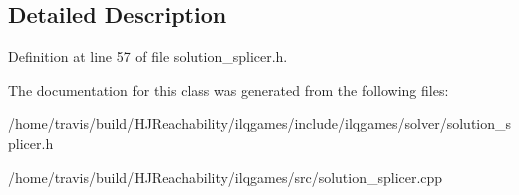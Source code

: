 \subsection{Detailed Description}


Definition at line 57 of file solution\+\_\+splicer.\+h.



The documentation for this class was generated from the following files\+:\begin{DoxyCompactItemize}
\item 
/home/travis/build/\+H\+J\+Reachability/ilqgames/include/ilqgames/solver/solution\+\_\+splicer.\+h\item 
/home/travis/build/\+H\+J\+Reachability/ilqgames/src/solution\+\_\+splicer.\+cpp\end{DoxyCompactItemize}
